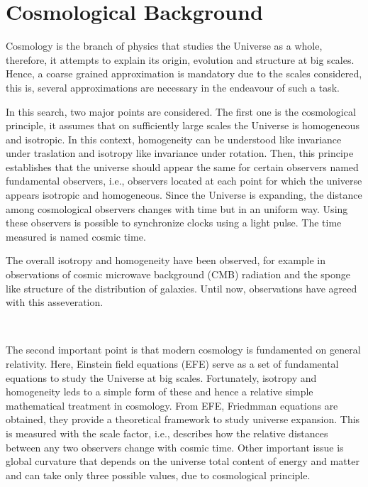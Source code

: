 	\chapter{ Cosmological Background }\label{chap:marco}

Cosmology is the branch of physics that studies the Universe as a whole, 
therefore, it attempts to explain its origin, evolution and structure 
at big scales. Hence, a coarse grained approximation is mandatory due
to the scales considered, 
this is, several approximations are necessary in the endeavour of such a task.

In this search, two major points are considered. The first one is the 
cosmological principle, it assumes that on sufficiently large scales the Universe 
is homogeneous and isotropic. In this context, homogeneity can be understood like invariance 
under traslation and isotropy like invariance under rotation. Then, this principe establishes that
the universe should appear the same for certain observers named fundamental observers,
i.e., observers located at each point for which the universe appears isotropic and
homogeneous. Since the Universe is expanding, the distance among cosmological observers
changes with time but in an uniform way. Using these observers is possible to synchronize 
clocks using a light pulse. The time measured is named cosmic time. 


The overall isotropy and homogeneity have been observed, for example in observations of 
cosmic microwave background (CMB) radiation and the sponge like structure
of the distribution of galaxies. Until now, observations have agreed with this asseveration.

\

The second important point is that modern cosmology is fundamented on general relativity.
Here, Einstein field equations (EFE) serve as a set of fundamental equations to study the 
Universe at big scales. Fortunately, isotropy and homogeneity leds to a simple form of 
these and hence a relative simple mathematical treatment in cosmology.
From EFE, Friedmman equations are obtained, they provide a theoretical 
framework to study universe expansion. This is measured with the 
scale factor, i.e., describes how the relative distances between any two observers
change with cosmic time.
Other important issue is global curvature that
depends on the universe total content of energy and matter and can
take only three possible values, due to cosmological principle. 

